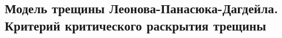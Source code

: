 

\subsection{Модель трещины Леонова-Панасюка-Дагдейла. Критерий критического раскрытия трещины}



